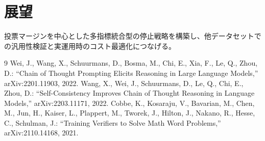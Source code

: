 \documentclass[twocolumn]{jsarticle}
\begin{document}
\section*{展望}
投票マージンを中心とした多指標統合型の停止戦略を構築し、他データセットでの汎用性検証と実運用時のコスト最適化につなげる。

{\footnotesize
\begin{thebibliography}{9}
 Wei, J., Wang, X., Schuurmans, D., Bosma, M., Chi, E., Xia, F., Le, Q., Zhou, D.: “Chain of Thought Prompting Elicits Reasoning in Large Language Models,” arXiv:2201.11903, 2022.
 Wang, X., Wei, J., Schuurmans, D., Le, Q., Chi, E., Zhou, D.: “Self-Consistency Improves Chain of Thought Reasoning in Language Models,” arXiv:2203.11171, 2022.
 Cobbe, K., Kosaraju, V., Bavarian, M., Chen, M., Jun, H., Kaiser, L., Plappert, M., Tworek, J., Hilton, J., Nakano, R., Hesse, C., Schulman, J.: “Training Verifiers to Solve Math Word Problems,” arXiv:2110.14168, 2021.
\end{thebibliography}}
\end{document}
